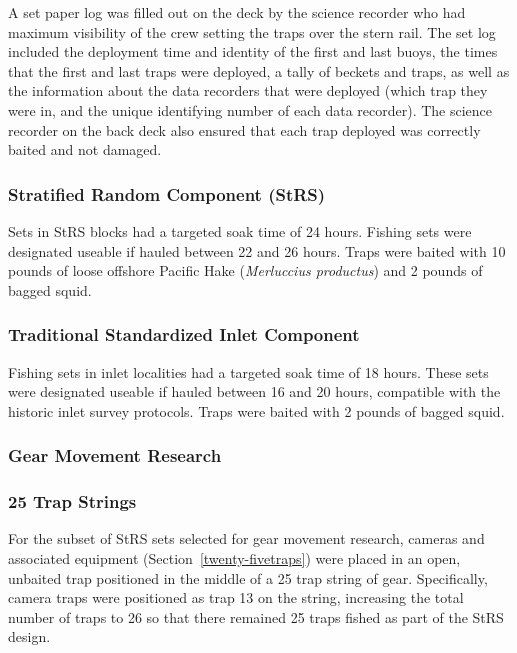 \documentclass[12pt]{article}\usepackage[]{graphicx}\usepackage[]{color}
\begin{document}
A set paper log was filled out on the deck by the science recorder who had maximum visibility of the crew setting the traps over the stern rail. The set log included the deployment time and identity of the first and last buoys, the times that the first and last traps were deployed, a tally of beckets and traps, as well as the information about the data recorders that were deployed (which trap they were in, and the unique identifying number of each data recorder). The science recorder on the back deck also ensured that each trap deployed was correctly baited and not damaged.

\hypertarget{stratified-random-component-strs}{%
\subsubsection{Stratified Random Component (StRS)}\label{stratified-random-component-strs}}

Sets in StRS blocks had a targeted soak time of 24 hours. Fishing sets were designated useable if hauled between 22 and 26 hours. Traps were baited with 10 pounds of loose offshore Pacific Hake (\emph{Merluccius productus}) and 2 pounds of bagged squid.

\hypertarget{traditional-standardized-inlet-component}{%
\subsubsection{Traditional Standardized Inlet Component}\label{traditional-standardized-inlet-component}}

Fishing sets in inlet localities had a targeted soak time of 18 hours. These sets were designated useable if hauled between 16 and 20 hours, compatible with the historic inlet survey protocols. Traps were baited with 2 pounds of bagged squid.

\hypertarget{gear-movement-research}{%
\subsubsection{Gear Movement Research}\label{gear-movement-research}}

\hypertarget{trap-strings}{%
\subsubsection{25 Trap Strings}\label{trap-strings}}

For the subset of StRS sets selected for gear movement research, cameras and associated equipment (Section~\ref{twenty-fivetraps}) were placed in an open, unbaited trap positioned in the middle of a 25 trap string of gear. Specifically, camera traps were positioned as trap 13 on the string, increasing the total number of traps to 26 so that there remained 25 traps fished as part of the StRS design.
\end{document}
